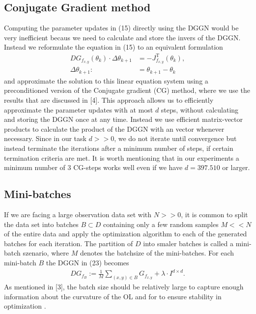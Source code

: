 \documentclass[conference]{IEEEtran}
\begin{document}
\subsection{Conjugate Gradient method}
Computing the parameter updates in (15) directly using the DGGN would be very inefficient becaus we need to calculate and store the invers of the DGGN. Instead we reformulate the equation in (15) to an equivalent formulation
\begin{align}
DG_{f_{x, y}}(\theta_{k})\cdot\Delta\theta_{k+1} &= -J_{f_{x, y}}^{\mathrm{T}}(\theta_{k}),\\
\Delta\theta_{k+1} :&= \theta_{k+1} - \theta_{k}
\end{align}
and approximate the solution to this linear equation system using a preconditioned version of the Conjugate gradient (CG) method, where we use the results that are discussed in [4]. 
This approach allows us to efficiently approximate the parameter updates with at most $d$ steps, without calculating and storing the DGGN once at any time. Instead we use efficient matrix-vector products to calculate the product of the DGGN with an vector whenever necessary. Since in our task $d>>0$, we do not iterate until convergence but instead terminate the iterations after a minimum number of steps, if certain termination criteria are met. It is worth mentioning that in our experiments a minimum number of 3 CG-steps works well even if we have $d=397.510$ or larger. 

\subsection{Mini-batches}
If we are facing a large observation data set with $N>>0$, it is common to split the data set into batches $B\subset D$ containing only a few random samples $M<<N$ of the entire data and apply the optimization algorithm to each of the generated batches for each iteration. The partition of $D$ into smaler batches is called a mini-batch szenario, where $M$ denotes the batchsize of the mini-batches. For each mini-batch $B$ the DGGN in (23) becomes
\begin{align}
DG_{f_{B}} := \frac{1}{M}\sum_{(x, y)\in B}^{}G_{f_{x, y}} + \lambda\cdot I^{d\times d}.
\end{align}
As mentioned in [3], the batch size should be relatively large to capture enough information about the curvature of the OL and for to ensure stability in optimization . 
\end{document}
